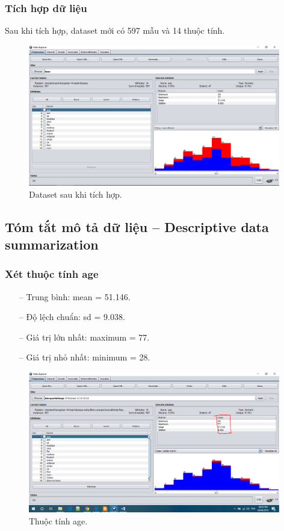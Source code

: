 \subsubsection{Tích hợp dữ liệu}
Sau khi tích hợp, dataset mới có 597 mẫu và 14 thuộc tính.
\begin{figure}[H]
\centering
\includegraphics[width=0.98\textwidth]{1/f.png}
\caption{Dataset sau khi tích hợp.}
\end{figure}


\subsection{Tóm tắt mô tả dữ liệu – Descriptive data summarization }
\subsubsection{Xét thuộc tính age}
\begin{itemize}
	\item[--]Trung bình: mean = 51.146.
	\item[--]Độ lệch chuẩn: sd = 9.038.
	\item[--]Giá trị lớn nhất: maximum = 77.
	\item[--]Giá trị nhỏ nhất: minimum = 28.
\end{itemize}
\begin{figure}[H]
\centering
\includegraphics[width=0.98\textwidth]{2/1.png}
\caption{Thuộc tính age.}
\end{figure}

